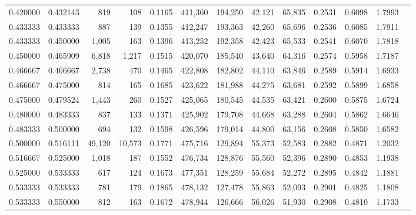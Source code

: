 \begin{tabular}{rrrrrrrrrrrrr}
0.420000 & 0.432143 &    819 &    108 &                                     0.1165 & 411,360 & 194,250 &  42,121 &  65,835 & 0.2531 & 0.6098 & 1.7993 \\
0.433333 & 0.433333 &    887 &    139 &                                     0.1355 & 412,247 & 193,363 &  42,260 &  65,696 & 0.2536 & 0.6085 & 1.7911 \\
0.433333 & 0.450000 &  1,005 &    163 &                                     0.1396 & 413,252 & 192,358 &  42,423 &  65,533 & 0.2541 & 0.6070 & 1.7818 \\
0.450000 & 0.465909 &  6,818 &  1,217 &                                     0.1515 & 420,070 & 185,540 &  43,640 &  64,316 & 0.2574 & 0.5958 & 1.7187 \\
0.466667 & 0.466667 &  2,738 &    470 &                                     0.1465 & 422,808 & 182,802 &  44,110 &  63,846 & 0.2589 & 0.5914 & 1.6933 \\
0.466667 & 0.475000 &    814 &    165 &                                     0.1685 & 423,622 & 181,988 &  44,275 &  63,681 & 0.2592 & 0.5899 & 1.6858 \\
0.475000 & 0.479524 &  1,443 &    260 &                                     0.1527 & 425,065 & 180,545 &  44,535 &  63,421 & 0.2600 & 0.5875 & 1.6724 \\
0.480000 & 0.483333 &    837 &    133 &                                     0.1371 & 425,902 & 179,708 &  44,668 &  63,288 & 0.2604 & 0.5862 & 1.6646 \\
0.483333 & 0.500000 &    694 &    132 &                                     0.1598 & 426,596 & 179,014 &  44,800 &  63,156 & 0.2608 & 0.5850 & 1.6582 \\
0.500000 & 0.516111 & 49,120 & 10,573 &                                     0.1771 & 475,716 & 129,894 &  55,373 &  52,583 & 0.2882 & 0.4871 & 1.2032 \\
0.516667 & 0.525000 &  1,018 &    187 &                                     0.1552 & 476,734 & 128,876 &  55,560 &  52,396 & 0.2890 & 0.4853 & 1.1938 \\
0.525000 & 0.533333 &    617 &    124 &                                     0.1673 & 477,351 & 128,259 &  55,684 &  52,272 & 0.2895 & 0.4842 & 1.1881 \\
0.533333 & 0.533333 &    781 &    179 &                                     0.1865 & 478,132 & 127,478 &  55,863 &  52,093 & 0.2901 & 0.4825 & 1.1808 \\
0.533333 & 0.550000 &    812 &    163 &                                     0.1672 & 478,944 & 126,666 &  56,026 &  51,930 & 0.2908 & 0.4810 & 1.1733 \\

\end{tabular}
